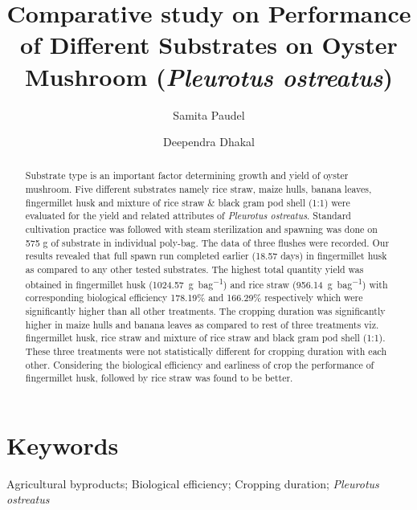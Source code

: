 \documentclass[]{elsarticle} %
\begin{document}
\begin{frontmatter}

  \title{Comparative study on Performance of Different Substrates on Oyster
Mushroom (\textit{Pleurotus ostreatus})}
    \author[Department of Horticulture and Plant Protection]{Samita Paudel}
  
    \author[Department of Plant Breeding]{Deependra Dhakal}
      
  \begin{abstract}
  Substrate type is an important factor determining growth and yield of
  oyster mushroom. Five different substrates namely rice straw, maize
  hulls, banana leaves, fingermillet husk and mixture of rice straw \&
  black gram pod shell (1:1) were evaluated for the yield and related
  attributes of \textit{Pleurotus ostreatus}. Standard cultivation
  practice was followed with steam sterilization and spawning was done on
  575 g of substrate in individual poly-bag. The data of three flushes
  were recorded. Our results revealed that full spawn run completed
  earlier (18.57 days) in fingermillet husk as compared to any other
  tested substrates. The highest total quantity yield was obtained in
  fingermillet husk (\SI{1024.57}{\gram \per bag}) and rice straw
  (\SI{956.14}{\gram \per bag}) with corresponding biological efficiency
  178.19\% and 166.29\% respectively which were significantly higher than
  all other treatments. The cropping duration was significantly higher in
  maize hulls and banana leaves as compared to rest of three treatments
  viz. fingermillet husk, rice straw and mixture of rice straw and black
  gram pod shell (1:1). These three treatments were not statistically
  different for cropping duration with each other. Considering the
  biological efficiency and earliness of crop the performance of
  fingermillet husk, followed by rice straw was found to be better.
  \end{abstract}
  
 \end{frontmatter}

\hypertarget{keywords}{%
\section*{Keywords}\label{keywords}}

Agricultural byproducts; Biological efficiency; Cropping duration;
\textit{Pleurotus ostreatus}
\end{document}

